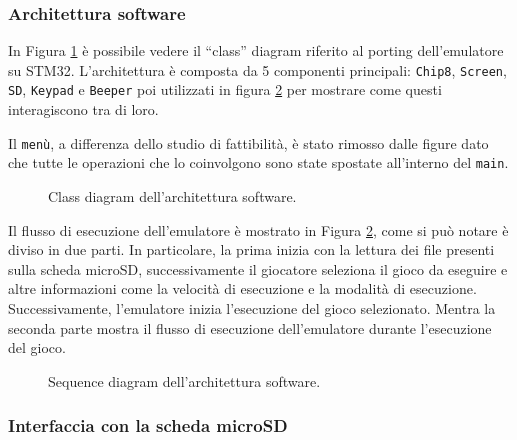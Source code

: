 \documentclass[a4paper]{article}
\begin{document}
\subsubsection{Architettura software}

In Figura \ref{fig:class_diagram} è possibile vedere il ``class'' diagram riferito al porting dell'emulatore su STM32. L'architettura è composta da 5 componenti principali: \texttt{Chip8}, \texttt{Screen}, \texttt{SD}, \texttt{Keypad} e \texttt{Beeper} poi utilizzati in figura \ref{fig:sequence_diagram} per mostrare come questi interagiscono tra di loro.

Il \texttt{menù}, a differenza dello studio di fattibilità, è stato rimosso dalle figure dato che tutte le operazioni che lo coinvolgono sono state spostate all'interno del \texttt{main}.

\begin{figure}[h!t]
    \begin{center}
        \begin{tikzpicture}[scale=0.6, transform shape]
            
        \end{tikzpicture}
    \end{center}
    \caption{
        Class diagram dell'architettura software.
    }
    \label{fig:class_diagram}
\end{figure}

Il flusso di esecuzione dell'emulatore è mostrato in Figura \ref{fig:sequence_diagram}, come si può notare è diviso in due parti. In particolare, la prima inizia con la lettura dei file presenti sulla scheda microSD, successivamente il giocatore seleziona il gioco da eseguire e altre informazioni come la velocità di esecuzione e la modalità di esecuzione. Successivamente, l'emulatore inizia l'esecuzione del gioco selezionato. Mentra la seconda parte mostra il flusso di esecuzione dell'emulatore durante l'esecuzione del gioco.

\begin{figure}[h!t]
    \begin{center}
        
    \end{center}
    \caption{
        Sequence diagram dell'architettura software.
    }
    \label{fig:sequence_diagram}
\end{figure}

\subsubsection{Interfaccia con la scheda microSD}\label{subsubsec:sd}
\end{document}
